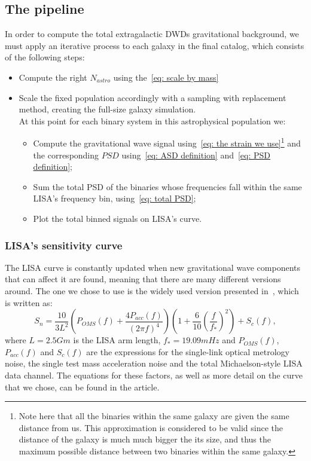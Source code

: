\subsection{The pipeline}
In order to compute the total extragalactic DWDs gravitational background, we must apply an iterative process to each galaxy in the final catalog, which consists of the following steps:
\begin{itemize}
    \item Compute the right $N_{astro}$ using the~\eqref{eq: scale by mass}
    \item Scale the fixed population accordingly with a sampling with replacement method, creating the full-size galaxy simulation.
    \vspace{1.5mm}\\
    At this point for each binary system in this astrophysical population we:
    \begin{itemize}
        \item Compute the gravitational wave signal using~\eqref{eq: the strain we use}\footnote{Note here that all the binaries within the same galaxy are given the same distance from us. This approximation is considered to be valid since the distance of the galaxy is much much bigger the its size, and thus the maximum possible distance between two binaries within the same galaxy.} and the corresponding $PSD$ using~\eqref{eq: ASD definition} and~\eqref{eq: PSD definition};
        \item Sum the total PSD of the binaries whose frequencies fall within the same LISA's frequency bin, using~\eqref{eq: total PSD};
        \item Plot the total binned signals on LISA's curve.
    \end{itemize}
\end{itemize}
\subsubsection{LISA's sensitivity curve}
The LISA curve is constantly updated when new gravitational wave components that can affect it are found, meaning that there are many different versions around.
The one we chose to use is the widely used version presented in~\cite{Robson_2019}, which is written as:
\begin{equation}
    S_n = \frac{10}{3L^2} \left( P_{OMS}(f) + \frac{4P_{acc}(f)}{(2\pi f)^4} \right)\left( 1 + \frac{6}{10}\left(\frac{f}{f_*}\right)^2 \right) + S_c(f),
    \label{eq: LISA sensitivity curve by Robson}
\end{equation}
where $L=2.5 Gm$ is the LISA arm length, $f_*=19.09mHz$ and $P_{OMS}(f)$, $P_{acc}(f)$ and $S_c(f)$ are the expressions for the single-link optical metrology noise, the single test mass acceleration noise and the total Michaelson-style LISA data channel. 
The equations for these factors, as well as more detail on the curve that we chose, can be found in the article.


